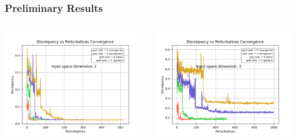 \documentclass[aspectratio=169]{beamer}
\begin{document}
\begin{frame}\frametitle{Preliminary Results}
\begin{columns}
\begin{column}{0.3\textwidth}
\includegraphics[width=\textwidth]{2.png}\\
\end{column}
\begin{column}{0.3\textwidth}
\includegraphics[width=\textwidth]{3.png}\\
\end{column}
\begin{column}{0.3\textwidth}

\end{column}
\end{columns}
\end{frame}
\end{document}
